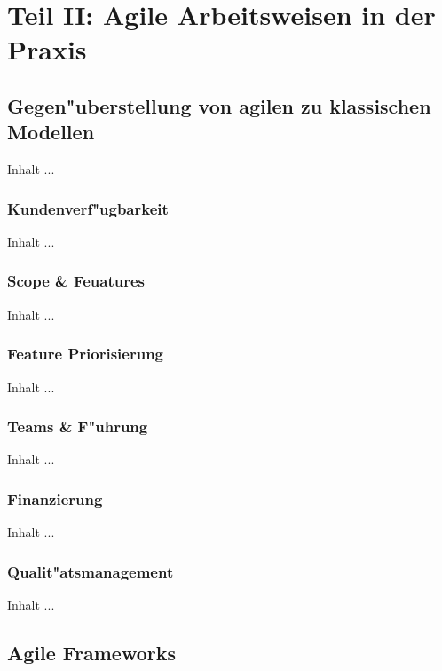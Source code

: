 
\chapter{Teil II: Agile Arbeitsweisen in der Praxis}
\minitoc 
\vspace{1 cm} 

\section{Gegen"uberstellung von agilen zu klassischen Modellen}
Inhalt ...

\subsection{Kundenverf"ugbarkeit}
Inhalt ...


\subsection{Scope \& Feuatures}
Inhalt ...

\subsection{Feature Priorisierung}
Inhalt ...

\subsection{Teams \& F"uhrung}
Inhalt ...

\subsection{Finanzierung}
Inhalt ...

\subsection{Qualit"atsmanagement}
Inhalt ...


\section{Agile Frameworks}

